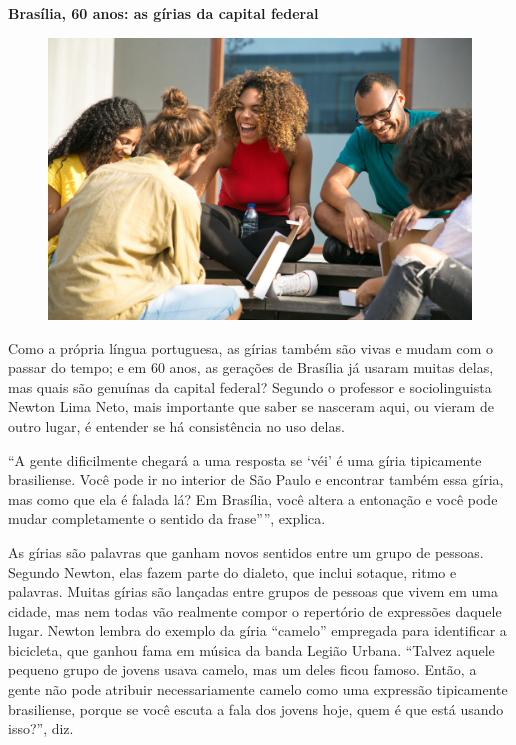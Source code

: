\begin{myquote}

\textbf{Brasília, 60 anos: as gírias da capital federal}

\begin{figure}[H]
\centering
\includegraphics[scale=0.25]{./imgSAEB_7_POR/media/image58.png}
\end{figure}

Como a própria língua portuguesa, as gírias também são vivas e mudam com o
passar do tempo; e em 60 anos, as gerações de Brasília já usaram muitas delas,
mas quais são genuínas da capital federal? Segundo o professor e
sociolinguista Newton Lima Neto, mais importante que saber se nasceram aqui,
ou vieram de outro lugar, é entender se há consistência no uso delas.

``A gente dificilmente chegará a uma resposta se `véi' é uma gíria tipicamente
brasiliense. Você pode ir no interior de São Paulo e encontrar também essa
gíria, mas como que ela é falada lá? Em Brasília, você altera a entonação e
você pode mudar completamente o sentido da frase''”, explica.

As gírias são palavras que ganham novos sentidos entre um grupo de pessoas.
Segundo Newton, elas fazem parte do dialeto, que inclui sotaque, ritmo e
palavras. Muitas gírias são lançadas entre grupos de pessoas que vivem em uma cidade,
mas nem todas vão realmente compor o repertório de expressões daquele lugar.
Newton lembra do exemplo da gíria ``camelo'' empregada para identificar a
bicicleta, que ganhou fama em música da banda Legião Urbana. ``Talvez aquele
pequeno grupo de jovens usava camelo, mas um deles ficou famoso. Então, a
gente não pode atribuir necessariamente camelo como uma expressão tipicamente
brasiliense, porque se você escuta a fala dos jovens hoje, quem é que está
usando isso?'', diz.


\end{myquote}


